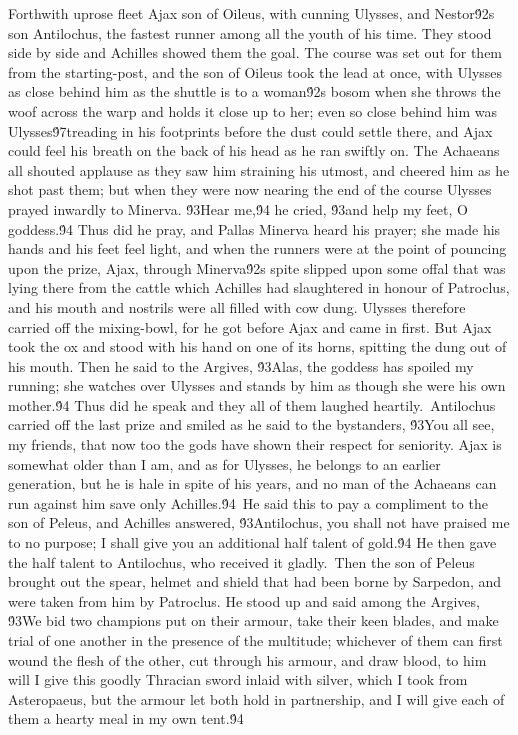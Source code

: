{Forthwith uprose fleet Ajax son of Oileus, with cunning Ulysses, and Nestor\'92s son Antilochus, the fastest runner among all the youth of his time. They stood side by side and Achilles showed them the goal. The course was set out for them from the starting-post, and the son of Oileus took the lead at once, with Ulysses as close behind him as the shuttle is to a woman\'92s bosom when she throws the woof across the warp and holds it close up to her; even so close behind him was Ulysses\'97treading in his footprints before the dust could settle there, and Ajax could feel his breath on the back of his head as he ran swiftly on. The Achaeans all shouted applause as they saw him straining his utmost, and cheered him as he shot past them; but when they were now nearing the end of the course Ulysses prayed inwardly to Minerva. \'93Hear me,\'94 he cried, \'93and help my feet, O goddess.\'94 Thus did he pray, and Pallas Minerva heard his prayer; she made his hands and his feet feel light, and when the runners were at the point of pouncing upon the prize, Ajax, through Minerva\'92s spite slipped upon some offal that was lying there from the cattle which Achilles had slaughtered in honour of Patroclus, and his mouth and nostrils were all filled with cow dung. Ulysses therefore carried off the mixing-bowl, for he got before Ajax and came in first. But Ajax took the ox and stood with his hand on one of its horns, spitting the dung out of his mouth. Then he said to the Argives, \'93Alas, the goddess has spoiled my running; she watches over Ulysses and stands by him as though she were his own mother.\'94 Thus did he speak and they all of them laughed heartily.\
Antilochus carried off the last prize and smiled as he said to the bystanders, \'93You all see, my friends, that now too the gods have shown their respect for seniority. Ajax is somewhat older than I am, and as for Ulysses, he belongs to an earlier generation, but he is hale in spite of his years, and no man of the Achaeans can run against him save only Achilles.\'94\
He said this to pay a compliment to the son of Peleus, and Achilles answered, \'93Antilochus, you shall not have praised me to no purpose; I shall give you an additional half talent of gold.\'94 He then gave the half talent to Antilochus, who received it gladly.\
Then the son of Peleus brought out the spear, helmet and shield that had been borne by Sarpedon, and were taken from him by Patroclus. He stood up and said among the Argives, \'93We bid two champions put on their armour, take their keen blades, and make trial of one another in the presence of the multitude; whichever of them can first wound the flesh of the other, cut through his armour, and draw blood, to him will I give this goodly Thracian sword inlaid with silver, which I took from Asteropaeus, but the armour let both hold in partnership, and I will give each of them a hearty meal in my own tent.\'94\
}
